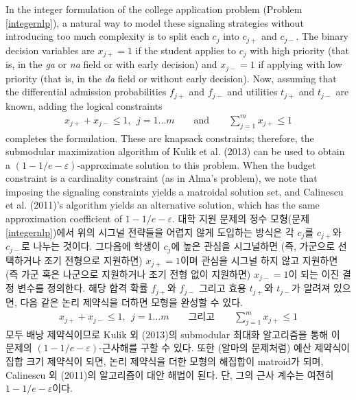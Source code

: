 \documentclass[11pt]{article} %
\theoremstyle{definition}
\theoremstyle{definition}
\begin{document}
\ifen
In the integer formulation of the college application problem (Problem \ref{integernlp}), a natural way to model these signaling strategies without introducing too much complexity is to split each $c_j$ into $c_{j+}$ and $c_{j-}$. The binary decision variables are $x_{j+} = 1$ if the student applies to $c_j$ with high priority (that is, in  the \emph{ga} or \emph{na} field or with early decision) and $x_{j-} = 1$ if applying with low priority (that is, in the \emph{da} field or without early decision). Now, assuming that the differential admission probabilities $f_{j+}$ and $f_{j-}$ and utilities $t_{j+}$ and $t_{j-}$ are known, adding the logical constraints 
\begin{align}
 x_{j+} + x_{j-} \leq 1, ~~ j = 1\dots m\qquad\text{and}\qquad\sum_{j=1}^m x_{j+} \leq 1
\end{align}
completes the formulation. These are knapsack constraints; therefore, the submodular maximization algorithm of Kulik et al. (2013) can be used to obtain a $(1 - 1/e - \varepsilon)$-approximate solution to this problem. When the budget constraint is a cardinality constraint (as in Alma's problem), we note that imposing the signaling constraints yields a matroidal solution set, and Calinescu et al. (2011)'s algorithm yields an alternative solution, which has the same approximation coefficient of $1 - 1/e -\varepsilon$. %
\else
대학 지원 문제의 정수 모형(문제 \ref{integernlp})에서 위의 시그널 전략들을 어렵지 않게 도입하는 방식은 각 $c_j$를 $c_{j+}$와 $c_{j-}$로 나누는 것이다. 그다음에 학생이 $c_j$에 높은 관심을 시그널하면 (즉, 가군으로 선택하거나 조기 전형으로 지원하면) $x_{j+} = 1$이며 관심을 시그널 하지 않고 지원하면 (즉 가군 혹은 나군으로 지원하거나 조기 전형 없이 지원하면) $x_{j-} = 1$이 되는 이진 결정 변수를 정의한다. 해당 합격 확률 $f_{j+}$와 $f_{j-}$ 그리고 효용  $t_{j+}$와 $t_{j-}$가 알려져 있으면, 다음 같은 논리 제약식을 더하면 모형을 완성할 수 있다. 
\begin{align}
 x_{j+} + x_{j-} \leq 1, ~~ j = 1\dots m\qquad\text{그리고}\qquad\sum_{j=1}^m x_{j+} \leq 1
\end{align}
모두 배낭 제약식이므로 Kulik 외 (2013)의 submodular 최대화 알고리즘을 통해 이 문제의 $(1 - 1/e - \varepsilon)$-근사해를 구할 수 있다. 또한 (알마의 문제처럼) 예산 제약식이 집합 크기 제약식이 되면, 논리 제약식을 더한 모형의 해집합이 matroid가 되며, Calinescu 외 (2011)의 알고리즘이 대안 해법이 된다. 단, 그의 근사 계수는 여전히 $1 - 1/e - \varepsilon$이다. 
\fi
\end{document}
